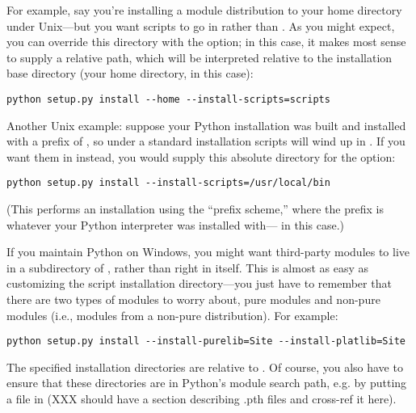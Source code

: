 \documentclass{howto}
\begin{document}
For example, say you're installing a module distribution to your home
directory under Unix---but you want scripts to go in
 rather than .  As you might
expect, you can override this directory with the
 option; in this case, it makes most sense to
supply a relative path, which will be interpreted relative to the
installation base directory (your home directory, in this case):
\begin{verbatim}
python setup.py install --home --install-scripts=scripts
\end{verbatim}

Another Unix example: suppose your Python installation was built and
installed with a prefix of , so under a standard 
installation scripts will wind up in .  If
you want them in  instead, you would supply this
absolute directory for the  option:
\begin{verbatim}
python setup.py install --install-scripts=/usr/local/bin
\end{verbatim}
(This performs an installation using the ``prefix scheme,'' where the
prefix is whatever your Python interpreter was installed with---
 in this case.)

If you maintain Python on Windows, you might want third-party modules to
live in a subdirectory of , rather than right in
 itself.  This is almost as easy as customizing the
script installation directory---you just have to remember that there are
two types of modules to worry about, pure modules and non-pure modules
(i.e., modules from a non-pure distribution).  For example:
\begin{verbatim}
python setup.py install --install-purelib=Site --install-platlib=Site
\end{verbatim}
The specified installation directories are relative to .
Of course, you also have to ensure that these directories are in
Python's module search path, e.g. by putting a  file in
 (XXX should have a section describing .pth files and
cross-ref it here).
\end{document}
